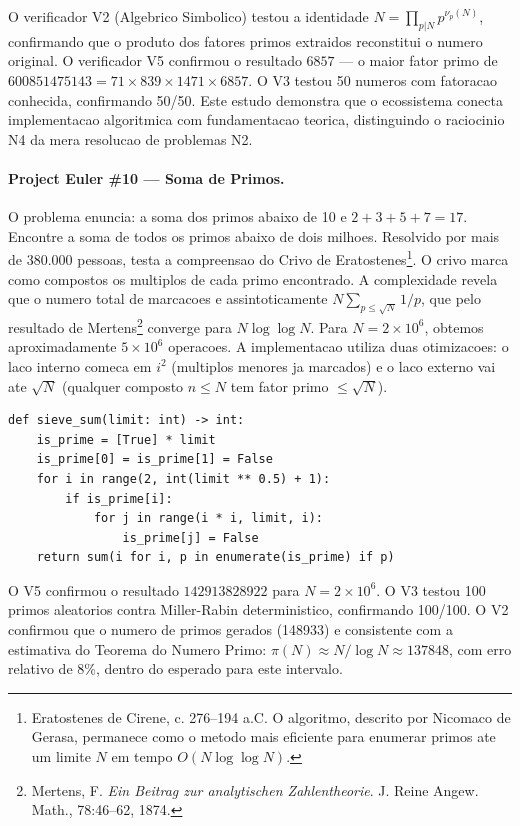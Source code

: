O verificador V2 (Algebrico Simbolico) testou a identidade
$N = \prod_{p|N} p^{\nu_p(N)}$, confirmando que o produto dos fatores
primos extraidos reconstitui o numero original. O verificador V5 confirmou
o resultado $6857$ --- o maior fator primo de $600851475143 = 71 \times
839 \times 1471 \times 6857$. O V3 testou 50 numeros com fatoracao
conhecida, confirmando 50/50. Este estudo demonstra que o ecossistema
conecta implementacao algoritmica com fundamentacao teorica, distinguindo
o raciocinio N4 da mera resolucao de problemas N2.

\paragraph{Project Euler \#10 --- Soma de Primos.}

O problema enuncia: a soma dos primos abaixo de 10 e $2+3+5+7=17$.
Encontre a soma de todos os primos abaixo de dois milhoes. Resolvido
por mais de 380.000 pessoas, testa a compreensao do Crivo de
Eratostenes\footnote{Eratostenes de Cirene, c. 276--194 a.C. O algoritmo,
descrito por Nicomaco de Gerasa, permanece como o metodo mais eficiente
para enumerar primos ate um limite $N$ em tempo $O(N \log \log N)$.}.
O crivo marca como compostos os multiplos de cada primo encontrado.
A complexidade revela que o numero total de marcacoes e assintoticamente
$N \sum_{p \leq \sqrt{N}} 1/p$, que pelo resultado de Mertens\footnote{Mertens, F.
\textit{Ein Beitrag zur analytischen Zahlentheorie}. J. Reine Angew. Math.,
78:46--62, 1874.} converge para $N \log \log N$. Para $N = 2 \times 10^6$,
obtemos aproximadamente $5 \times 10^6$ operacoes. A implementacao utiliza
duas otimizacoes: o laco interno comeca em $i^2$ (multiplos menores ja
marcados) e o laco externo vai ate $\sqrt{N}$ (qualquer composto $n \leq N$
tem fator primo $\leq \sqrt{N}$).

\begin{verbatim}
def sieve_sum(limit: int) -> int:
    is_prime = [True] * limit
    is_prime[0] = is_prime[1] = False
    for i in range(2, int(limit ** 0.5) + 1):
        if is_prime[i]:
            for j in range(i * i, limit, i):
                is_prime[j] = False
    return sum(i for i, p in enumerate(is_prime) if p)
\end{verbatim}

O V5 confirmou o resultado $142913828922$ para $N = 2 \times 10^6$.
O V3 testou 100 primos aleatorios contra Miller-Rabin deterministico,
confirmando 100/100. O V2 confirmou que o numero de primos gerados
(148933) e consistente com a estimativa do Teorema do Numero Primo:
$\pi(N) \approx N / \log N \approx 137848$, com erro relativo de $8\%$,
dentro do esperado para este intervalo.

